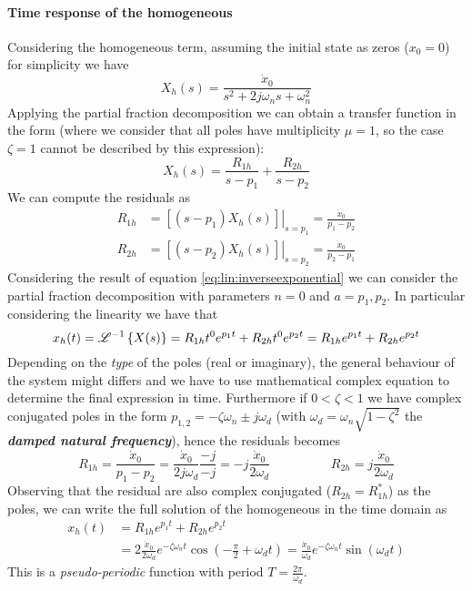 		\paragraph{Time response of the homogeneous} Considering the homogeneous term, assuming the initial state as zeros ($x_0 = 0$) for simplicity we have
		\[ X_h(s) = \frac{ \dot x_0}{s^2 + 2 j\omega_ns + \omega_n^2} \]
		Applying the partial fraction decomposition we can obtain a transfer function in the form (where we consider that all poles have multiplicity $\mu =1$, so the case $\zeta = 1$ cannot be described by this expression):
		\[ X_h(s) = \frac{R_{1h}}{s-p_1} + \frac{R_{2h}}{s-p_2} \]
		We can compute the residuals as
		\begin{align*}
			R_{1h} & = \left.\left[ (s-p_1) X_h(s)\right] \right|_{s=p_1} = \frac{\dot x_0}{p_1-p_2} \\
			R_{2h} & = \left.\left[ (s-p_2) X_h(s)\right] \right|_{s=p_2} = \frac{\dot x_0}{p_2-p_1} 		
		\end{align*}
		Considering the result of equation \ref{eq:lin:inverseexponential} we can consider the partial fraction decomposition with parameters $n=0$ and $a = p_1,p_2$. In particular considering the linearity we have that
		\[ x_h(t) = \mathscr L^{-1} \left\{ X(s) \right\} = R_{1h} t^0 e^{p_1t} + R_{2h} t^0 e^{p_2t} = R_{1h} e^{p_1t} + R_{2h} e^{p_2t}  \]
		Depending on the \textit{type} of the poles (real or imaginary), the general behaviour of the system might differs and we have to use mathematical complex equation to determine the final expression in time. Furthermore if $0 < \zeta < 1$ we have complex conjugated poles in the form $p_{1,2} = -\zeta \omega_n \pm j\omega_d$ (with $\omega_d = \omega_n\sqrt{1-\zeta^2}$ the \textbf{\textit{damped natural frequency}}), hence the residuals becomes
			\[ R_{1h} = \frac{\dot x_0}{p_1-p_2} = \frac{\dot x_0}{2j \omega_d} \frac{-j}{-j} = - j \frac{\dot x_0}{2\omega_d}  \hspace{2cm} R_{2h} = j \frac{\dot x_0}{2\omega_d} \]
			Observing that the residual are also complex conjugated ($R_{2h} = R_{1h}^*$) as the poles, we can write the full solution of the homogeneous in the time domain as
			\begin{equation}
			\begin{aligned}
				x_h(t) & = R_{1h} e^{p_1t} + R_{2h} e^{p_2t} \\
				& = 2 \frac{\dot x_0}{2\omega_d} e^{-\zeta \omega_n t} \cos\left( -\frac \pi 2 + \omega_d t \right) = \frac{\dot x_0}{\omega_d} e^{-\zeta \omega_n t} \sin\left( \omega_d t \right)
			\end{aligned}
			\end{equation}
			This is a \textit{pseudo-periodic} function with period $T = \frac {2\pi }{\omega_d}$.
			
